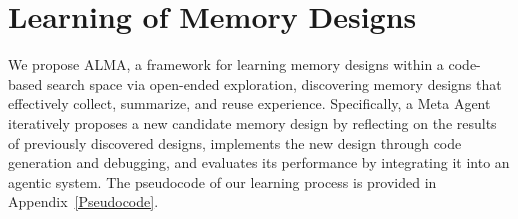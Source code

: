 \documentclass{article}
\theoremstyle{plain}
\theoremstyle{definition}
\theoremstyle{remark}
\newcommand{\ouralgo}{ALMA\xspace} %
\begin{document}
\vspace{-0.4em}
\section{Learning of Memory Designs}


We propose \ouralgo, a framework for learning memory designs within a code-based search space via open-ended exploration, discovering memory designs that effectively collect, summarize, and reuse experience.
Specifically, a Meta Agent \citep{hu2024ADAS} iteratively proposes a new candidate memory design by reflecting on the results of previously discovered designs, implements the new design through code generation and debugging, and evaluates its performance by integrating it into an agentic system. 
The pseudocode of our learning process is provided in Appendix~\ref{Pseudocode}.

\end{document}
